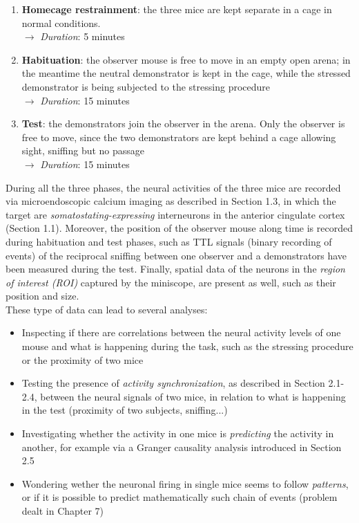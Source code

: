 \documentclass[a4paper]{article}
\begin{document}
\begin{enumerate}
	
	\item \textbf{Homecage restrainment}: the three mice are kept separate in a cage in normal conditions. \\
	$\longrightarrow$ \textit{Duration}: 5 minutes
	
	\item \textbf{Habituation}: the observer mouse is free to move in an empty open arena; in the meantime the neutral demonstrator is kept in the cage, while the stressed demonstrator is being subjected to the stressing procedure \\
	$\longrightarrow$  \textit{Duration}: 15 minutes
	
	\item \textbf{Test}: the demonstrators join the observer in the arena. Only the observer is free to move, since the two demonstrators are kept behind a cage allowing sight, sniffing but no passage \\
	$\longrightarrow$  \textit{Duration}: 15 minutes
\end{enumerate}

During all the three phases, the neural activities of the three mice are recorded via microendoscopic calcium imaging as described in Section 1.3, in which the target are \textit{somatostating-expressing} interneurons in the anterior cingulate cortex (Section 1.1). Moreover, the position of the observer mouse along time is recorded during habituation and test phases, such as TTL signals (binary recording of events) of the reciprocal sniffing between one observer and a demonstrators have been measured during the test. Finally, spatial data of the neurons in the \textit{region of interest (ROI)} captured by the miniscope, are present as well, such as their position and size.\\
These type of data can lead to several analyses:
\begin{itemize}
	
	\item Inspecting if there are correlations between the neural activity levels of one mouse and what is happening during the task, such as the stressing procedure or the proximity of two mice
	
	\item Testing the presence of \textit{activity synchronization}, as described in Section 2.1-2.4, between the neural signals of two mice, in relation to what is happening in the test (proximity of two subjects, sniffing...)
	
	\item Investigating whether the activity in one mice is \textit{predicting} the activity in another, for example via a Granger causality analysis introduced in Section 2.5
	
	\item Wondering wether the neuronal firing in single mice seems to follow \textit{patterns}, or if it is possible to predict mathematically such chain of events (problem dealt in Chapter 7)
\end{itemize}
	
\end{document}

